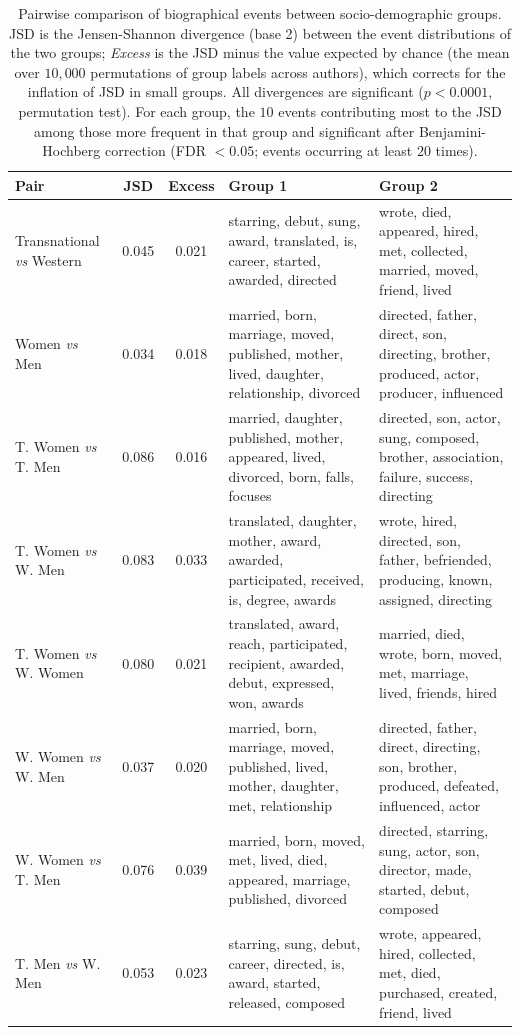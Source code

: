 \begin{table}
    \centering
    \small
    \begin{tabular}{l|c|c|p{5.2cm}|p{5.2cm}}
        \toprule
        \textbf{Pair} & \textbf{JSD} & \textbf{Excess} & \textbf{Group 1} & \textbf{Group 2} \\
        \midrule
        Transnational \textit{vs} Western & 0.045 & 0.021 & starring, debut, sung, award, translated, is, career, started, awarded, directed & wrote, died, appeared, hired, met, collected, married, moved, friend, lived \\
        Women \textit{vs} Men & 0.034 & 0.018 & married, born, marriage, moved, published, mother, lived, daughter, relationship, divorced & directed, father, direct, son, directing, brother, produced, actor, producer, influenced \\
        T. Women \textit{vs} T. Men & 0.086 & 0.016 & married, daughter, published, mother, appeared, lived, divorced, born, falls, focuses & directed, son, actor, sung, composed, brother, association, failure, success, directing \\
        T. Women \textit{vs} W. Men & 0.083 & 0.033 & translated, daughter, mother, award, awarded, participated, received, is, degree, awards & wrote, hired, directed, son, father, befriended, producing, known, assigned, directing \\
        T. Women \textit{vs} W. Women & 0.080 & 0.021 & translated, award, reach, participated, recipient, awarded, debut, expressed, won, awards & married, died, wrote, born, moved, met, marriage, lived, friends, hired \\
        W. Women \textit{vs} W. Men & 0.037 & 0.020 & married, born, marriage, moved, published, lived, mother, daughter, met, relationship & directed, father, direct, directing, son, brother, produced, defeated, influenced, actor \\
        W. Women \textit{vs} T. Men & 0.076 & 0.039 & married, born, moved, met, lived, died, appeared, marriage, published, divorced & directed, starring, sung, actor, son, director, made, started, debut, composed \\
        T. Men \textit{vs} W. Men & 0.053 & 0.023 & starring, sung, debut, career, directed, is, award, started, released, composed & wrote, appeared, hired, collected, met, died, purchased, created, friend, lived \\
        \bottomrule
    \end{tabular}
    \caption{Pairwise comparison of biographical events between socio-demographic groups. JSD is the Jensen-Shannon divergence (base 2) between the event distributions of the two groups; \textit{Excess} is the JSD minus the value expected by chance (the mean over $10{,}000$ permutations of group labels across authors), which corrects for the inflation of JSD in small groups. All divergences are significant ($p < 0.0001$, permutation test). For each group, the $10$ events contributing most to the JSD among those more frequent in that group and significant after Benjamini-Hochberg correction (FDR $< 0.05$; events occurring at least $20$ times).}
    \label{tab:jsd_comparison}
\end{table}
